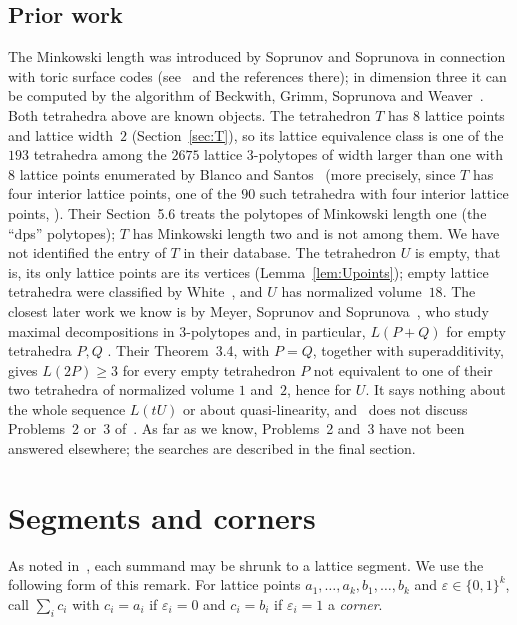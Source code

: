\documentclass[11pt]{article}
\theoremstyle{definition}
\theoremstyle{remark}
\begin{document}
\subsection*{Prior work}
The Minkowski length was introduced by Soprunov and Soprunova in connection
with toric surface codes (see~\cite{ss} and the references there); in
dimension three it can be computed by the algorithm of Beckwith, Grimm,
Soprunova and Weaver~\cite{bgsw}. Both tetrahedra above are known objects.
The tetrahedron $T$ has $8$ lattice points and lattice width~$2$
(Section~\ref{sec:T}), so its lattice equivalence class is one of the $193$
tetrahedra among the $2675$ lattice $3$-polytopes of width larger than one
with $8$ lattice points enumerated by Blanco and Santos~\cite[Theorem~4 and
Table~2]{bs} (more precisely, since $T$ has four interior lattice points, one
of the $90$ such tetrahedra with four interior lattice points,
\cite[Table~5]{bs}). Their Section~5.6 treats the polytopes of Minkowski length one
(the ``dps'' polytopes); $T$ has Minkowski length two and is not among them.
We have not identified the entry of $T$ in their database. The tetrahedron $U$
is empty, that is, its only lattice points are its vertices
(Lemma~\ref{lem:Upoints}); empty lattice tetrahedra were classified by
White~\cite{white}, and $U$ has normalized volume~$18$. The closest later work
we know is by Meyer, Soprunov and Soprunova~\cite{mss}, who study maximal
decompositions in $3$-polytopes and, in particular, $L(P+Q)$ for empty
tetrahedra $P,Q$ \cite[Lemma~3.2 and Theorem~3.4]{mss}. Their Theorem~3.4,
with $P=Q$, together with superadditivity, gives $L(2P)\ge3$ for every empty
tetrahedron $P$ not equivalent to one of their two tetrahedra of normalized
volume $1$ and~$2$, hence for $U$. It says nothing about the whole sequence
$L(tU)$ or about quasi-linearity, and~\cite{mss} does not discuss Problems~2
or~3 of~\cite{ss}. As far as we know, Problems~2 and~3 have not been answered
elsewhere; the searches are described in the final section.

\section{Segments and corners}\label{sec:prelim}

As noted in~\cite[p.~3]{ss}, each summand may be shrunk to a lattice segment.
We use the following form of this remark. For lattice points
$a_1,\dots,a_k,b_1,\dots,b_k$ and $\varepsilon\in\{0,1\}^k$, call
$\sum_i c_i$ with $c_i=a_i$ if $\varepsilon_i=0$ and $c_i=b_i$ if
$\varepsilon_i=1$ a \emph{corner}.
\end{document}
